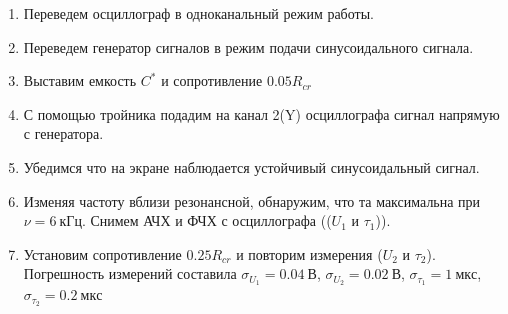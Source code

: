 \documentclass[14pt, a4paper]{report}
\begin{document}
\begin{enumerate}

\setcounter{enumi}{0}

\item Переведем осциллограф в одноканальный режим работы.

\item Переведем генератор сигналов в режим подачи синусоидального сигнала.

\item Выставим емкость $C^*$ и сопротивление $0.05R_{cr}$

\item С помощью тройника подадим на канал 2(Y) осциллографа сигнал напрямую с генератора.

\item Убедимся что на экране наблюдается устойчивый синусоидальный сигнал.

\item Изменяя частоту вблизи резонансной, обнаружим, что та максимальна при $\nu=6\ кГц$. Снимем АЧХ и ФЧХ с осциллографа (($U_1$ и $\tau_1$)).

\item Установим сопротивление $0.25R_{cr}$ и повторим измерения ($U_2$ и $\tau_2$). Погрешность измерений составила $\sigma_{U_1}=0.04\ В$, $\sigma_{U_2}=0.02\ В$, $\sigma_{\tau_1}=1\ мкс$, $\sigma_{\tau_2}=0.2\ мкс$ 


\end{enumerate}
\end{document}
